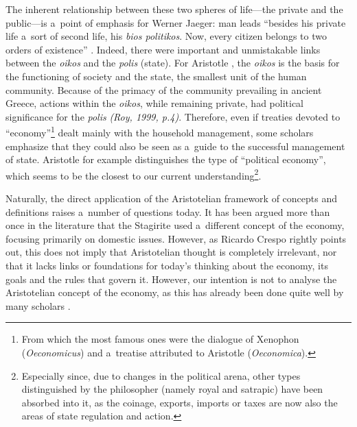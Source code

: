 The inherent relationship between these two spheres of life---the private and the public---is a~point of emphasis for Werner Jaeger: man leads ``besides his private life a~sort of second life, his \textit{bios politikos}. Now, every citizen belongs to two orders of existence'' 
\parencite[][p.111]{jaeger_paideia_1946}. %
 Indeed, there were important and unmistakable links between the \textit{oikos} and the \textit{polis} (state). For Aristotle 
\parencite[][]{}, %
 the \textit{oikos} is the basis for the functioning of society and the state, the smallest unit of the human community. Because of the primacy of the community prevailing in ancient Greece, actions within the \textit{oikos}, while remaining private, had political significance for the \textit{polis} \label{ref:RNDgDEuVBJb3a}\textit{(Roy, 1999, p.4)}. Therefore, even if treaties devoted to ``economy''\footnote{From which the most famous ones were the dialogue of Xenophon (\textit{Oeconomicus}) and a~treatise attributed to Aristotle (\textit{Oeconomica}).} dealt mainly with the household management, some scholars emphasize that they could also be seen as a~guide to the successful management of state. Aristotle 
\parencite*[][p.1345b]{} %
 for example distinguishes the type of ``political economy'', which seems to be the closest to our current understanding\footnote{Especially since, due to changes in the political arena, other types distinguished by the philosopher (namely royal and satrapic) have been absorbed into it, as the coinage, exports, imports or taxes are now also the areas of state regulation and action.}.



Naturally, the direct application of the Aristotelian framework of concepts and definitions raises a~number of questions today. It has been argued more than once in the literature that the Stagirite used a~different concept of the economy, focusing primarily on domestic issues. However, as Ricardo Crespo 
\parencite*[][]{crespo_aristotle_2010} %
 rightly points out, this does not imply that Aristotelian thought is completely irrelevant, nor that it lacks links or foundations for today's thinking about the economy, its goals and the rules that govern it. However, our intention is not to analyse the Aristotelian concept of the economy, as this has already been done quite well by many scholars 
\parencites[e.g.,][]{crespo_ontology_2006}[][]{crespo_aristotle_2010}[][]{meikle_aristotles_1995}[][]{soudek_aristotles_1952}[][]{pack_aristotles_2008}[][]{finley_aristotle_1970}.%




